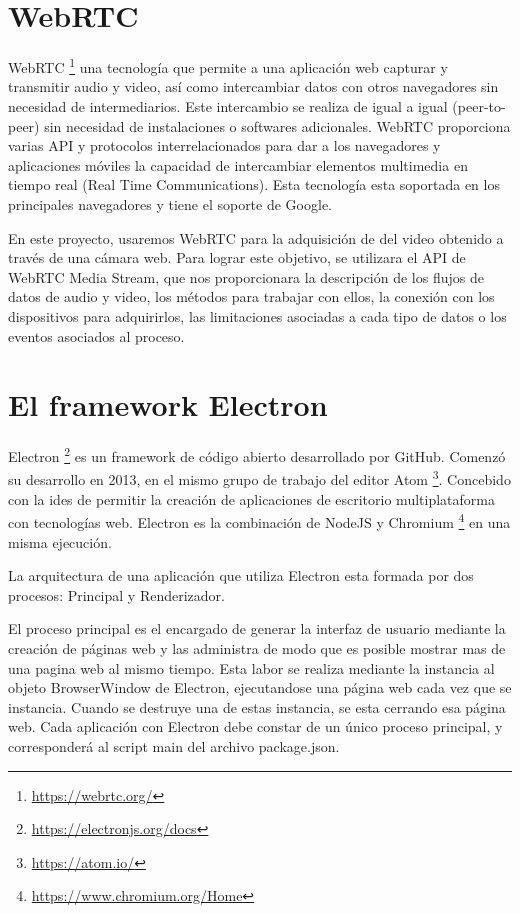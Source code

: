 \section{WebRTC}
WebRTC \footnote{\url{https://webrtc.org/}}  una tecnología que permite a una aplicación web capturar y transmitir audio y video, así como intercambiar datos con otros navegadores sin necesidad de intermediarios. Este intercambio se realiza de igual a igual (peer-to-peer) sin necesidad de instalaciones o softwares adicionales. WebRTC proporciona varias API y protocolos interrelacionados para dar a los navegadores y aplicaciones móviles la capacidad de intercambiar elementos multimedia en tiempo real (Real Time Communications). Esta tecnología esta soportada en los principales navegadores y tiene el soporte de Google.

En este proyecto, usaremos WebRTC para la adquisición de del video obtenido a través de una cámara web. Para lograr este objetivo, se utilizara el API de WebRTC Media Stream, que nos proporcionara la descripción de los flujos de datos de audio y video, los métodos para trabajar con ellos, la conexión con los dispositivos para adquirirlos, las limitaciones asociadas a cada tipo de datos o los eventos asociados al proceso.

\section{El framework Electron}
Electron \footnote{\url{https://electronjs.org/docs}}  es un framework de código abierto desarrollado por GitHub. Comenzó su desarrollo en 2013, en el mismo grupo de trabajo del editor Atom \footnote{\url{https://atom.io/}}. Concebido con la ides de permitir la creación de aplicaciones de escritorio multiplataforma con tecnologías web. Electron es la combinación de NodeJS y Chromium \footnote{\url{https://www.chromium.org/Home}} en una misma ejecución.

La arquitectura de una aplicación que utiliza Electron esta formada por dos procesos: Principal y Renderizador. 

El proceso principal es el encargado de generar la interfaz de usuario mediante la creación de páginas web y las administra de modo que es posible mostrar mas de una pagina web al mismo tiempo. Esta labor se realiza mediante la instancia al objeto BrowserWindow de Electron, ejecutandose una página web cada vez que se instancia. Cuando se destruye una de estas instancia, se esta cerrando esa página web. Cada aplicación con Electron debe constar de un único proceso principal, y corresponderá al script main del archivo package.json.

